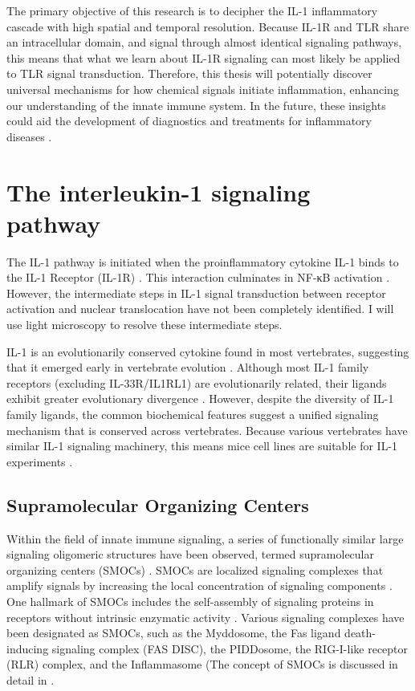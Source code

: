 The primary objective of this research is to decipher the IL-1 inflammatory cascade with high spatial and temporal resolution. Because IL-1R and TLR share an intracellular domain, and signal through almost identical signaling pathways, this means that what we learn about IL-1R signaling can most likely be applied to TLR signal transduction. Therefore, this thesis will potentially discover universal mechanisms for how chemical signals initiate inflammation, enhancing our understanding of the innate immune system. In the future, these insights could aid the development of diagnostics and treatments for inflammatory diseases \autocite{Donath_2019}\autocite{Netea_2020}.
 
\chapter{The interleukin-1 signaling pathway}
\label{chapter:pathway}
The IL-1 pathway is initiated when the proinflammatory cytokine IL-1{\textbeta} binds to the IL-1 Receptor (IL-1R) \autocite{Dinarello_2019}\autocite{Dinarello_2018}. This interaction culminates in NF-κB activation \autocite{Takeuchi_2002}. However, the intermediate steps in IL-1 signal transduction between receptor activation and nuclear translocation have not been completely identified. I will use light microscopy to resolve these intermediate steps.
 
IL-1 is an evolutionarily conserved cytokine found in most vertebrates, suggesting that it emerged early in vertebrate evolution \autocite{Bird_2002}\autocite{Rivers-Auty_2018}. Although most IL-1 family receptors (excluding IL-33R/IL1RL1) are evolutionarily related, their ligands exhibit greater evolutionary divergence \autocite{Rivers-Auty_2018}. However, despite the diversity of IL-1 family ligands, the common biochemical features suggest a unified signaling mechanism that is conserved across vertebrates. Because various vertebrates have similar IL-1 signaling machinery, this means mice cell lines are suitable for IL-1 experiments \autocite{Pinteaux_2020}.

\section{Supramolecular Organizing Centers}
\label{section:SMOC}
Within the field of innate immune signaling, a series of functionally similar large signaling oligomeric structures have been observed, termed supramolecular organizing centers (SMOCs) \autocite{Kagan_2014}. SMOCs are localized signaling complexes that amplify signals by increasing the local concentration of signaling components \autocite{Kagan_2014}. One hallmark of SMOCs includes the self-assembly of signaling proteins in receptors without intrinsic enzymatic activity \autocite{Kagan_2014}. Various signaling complexes have been designated as SMOCs, such as the Myddosome, the Fas ligand death-inducing signaling complex (FAS DISC), the PIDDosome, the RIG-I-like receptor (RLR) complex, and the Inflammasome (The concept of SMOCs is discussed in detail in \autocite{Kagan_2014}\autocite{Qiao_2015}\autocite{Tan_2019}.
 
